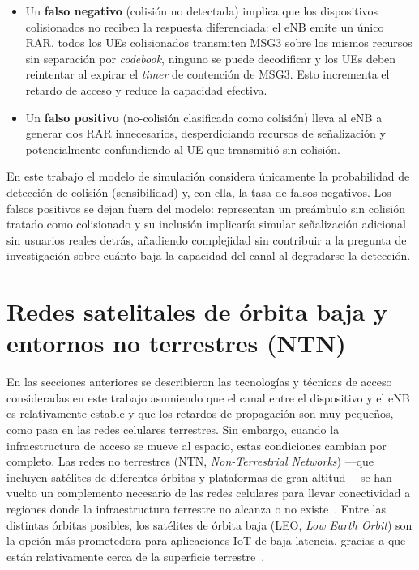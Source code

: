 \begin{itemize}
    \item Un \textbf{falso negativo} (colisión no detectada) implica que los dispositivos
          colisionados no reciben la respuesta diferenciada: el eNB emite un único RAR,
          todos los UEs colisionados transmiten MSG3 sobre los mismos recursos sin
          separación por \textit{codebook}, ninguno se puede decodificar y los UEs deben
          reintentar al expirar el \textit{timer} de contención de MSG3. Esto incrementa
          el retardo de acceso y reduce la capacidad efectiva.

    \item Un \textbf{falso positivo} (no-colisión clasificada como colisión) lleva al
          eNB a generar dos RAR innecesarios, desperdiciando recursos de
          señalización y potencialmente confundiendo al UE que transmitió sin colisión.
\end{itemize}

En este trabajo el modelo de simulación considera únicamente la probabilidad
de detección de colisión (sensibilidad) y, con ella, la tasa de falsos negativos. Los
falsos positivos se dejan fuera del modelo: representan un preámbulo sin colisión
tratado como colisionado y su inclusión implicaría simular señalización adicional sin
usuarios reales detrás, añadiendo complejidad sin contribuir a la pregunta de
investigación sobre cuánto baja la capacidad del canal al degradarse la detección.


\section{Redes satelitales de órbita baja y entornos no terrestres (NTN)}

En las secciones anteriores se describieron las tecnologías y técnicas de acceso consideradas
en este trabajo asumiendo que el canal entre el dispositivo y el eNB es
relativamente estable y que los retardos de propagación son muy pequeños, como pasa en las
redes celulares terrestres. Sin embargo, cuando la infraestructura de acceso se mueve al
espacio, estas condiciones cambian por completo. Las redes no terrestres (NTN,
\textit{Non-Terrestrial Networks}) ---que incluyen satélites de diferentes órbitas y
plataformas de gran altitud--- se han vuelto un complemento necesario de las redes celulares
para llevar conectividad a regiones donde la infraestructura terrestre no alcanza o no
existe~\cite{ref3, ref7}. Entre las distintas órbitas posibles, los satélites de órbita
baja (LEO, \textit{Low Earth Orbit}) son la opción más prometedora para aplicaciones IoT de
baja latencia, gracias a que están relativamente cerca de la superficie
terrestre~\cite{ref3, ref8}.

